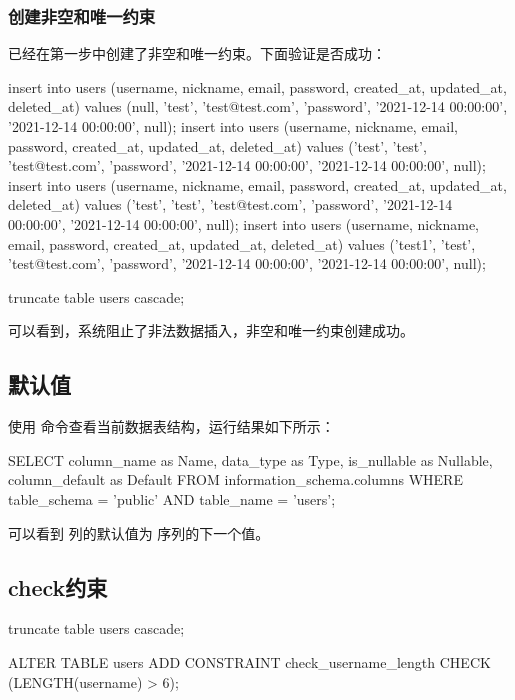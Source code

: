 \documentclass{ctexrep}
\begin{document}
\subsubsection{创建非空和唯一约束}
已经在第一步中创建了非空和唯一约束。下面验证是否成功：
\begin{run}
    insert into users (username, nickname, email, password, created_at, updated_at, deleted_at) values (null, 'test', 'test@test.com', 'password', '2021-12-14 00:00:00', '2021-12-14 00:00:00', null);
    insert into users (username, nickname, email, password, created_at, updated_at, deleted_at) values ('test', 'test', 'test@test.com', 'password', '2021-12-14 00:00:00', '2021-12-14 00:00:00', null);
    insert into users (username, nickname, email, password, created_at, updated_at, deleted_at) values ('test', 'test', 'test@test.com', 'password', '2021-12-14 00:00:00', '2021-12-14 00:00:00', null);
    insert into users (username, nickname, email, password, created_at, updated_at, deleted_at) values ('test1', 'test', 'test@test.com', 'password', '2021-12-14 00:00:00', '2021-12-14 00:00:00', null);
\end{run}
\begin{runsilent}
    truncate table users cascade;
\end{runsilent}
可以看到，系统阻止了非法数据插入，非空和唯一约束创建成功。
\subsection{默认值}
使用  命令查看当前数据表结构，运行结果如下所示：

\begin{run}
    SELECT column_name as Name, data_type as Type, is_nullable as Nullable, column_default as Default FROM information_schema.columns WHERE table_schema = 'public' AND table_name = 'users';
\end{run}

可以看到  列的默认值为  序列的下一个值。

\subsection{check约束}
\begin{runsilent}
    truncate table users cascade;
\end{runsilent}
\begin{run}
    ALTER TABLE users ADD CONSTRAINT check_username_length CHECK (LENGTH(username) > 6);
\end{run}
\end{document}
